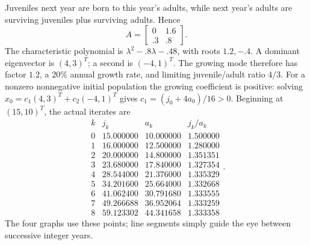 Juveniles next year are born to this year's adults, while next year's
adults are surviving juveniles plus surviving adults. Hence
\[A=\begin{bmatrix}0&1.6\\.3&.8\end{bmatrix}.\]
The characteristic polynomial is $\lambda^2-.8\lambda-.48$,
with roots $1.2,-.4$. A dominant eigenvector is $(4,3)^T$;
a second is $(-4,1)^T$. The growing mode therefore has factor
$1.2$, a $20\%$ annual growth rate, and limiting juvenile/adult
ratio $4/3$. For a nonzero nonnegative initial population the growing
coefficient is positive: solving $x_0=c_1(4,3)^T+c_2(-4,1)^T$
gives $c_1=(j_0+4a_0)/16>0$.
Beginning at $(15,10)^T$, the actual iterates are
\[\begin{array}{c|rrr}
k&j_k&a_k&j_k/a_k\\\hline
0&15.000000&10.000000&1.500000\\
1&16.000000&12.500000&1.280000\\
2&20.000000&14.800000&1.351351\\
3&23.680000&17.840000&1.327354\\
4&28.544000&21.376000&1.335329\\
5&34.201600&25.664000&1.332668\\
6&41.062400&30.791680&1.333555\\
7&49.266688&36.952064&1.333259\\
8&59.123302&44.341658&1.333358
\end{array}.\]
The four graphs use these points; line segments simply guide the eye
between successive integer years.
